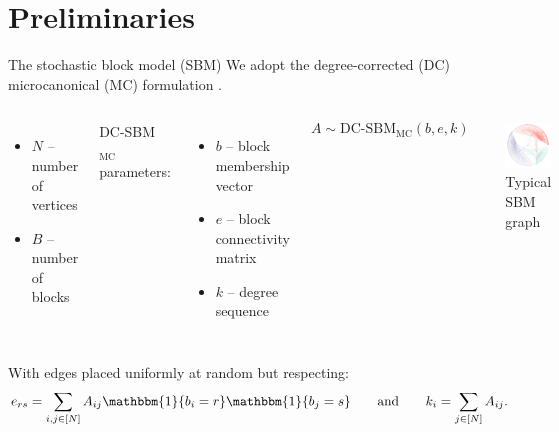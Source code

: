 \documentclass{beamer}
\newcommand{\one}{\mathbbm{1}}
\begin{document}
\section{Preliminaries}
	
	\begin{frame}{The stochastic block model (SBM)}
		We adopt the degree-corrected (DC) microcanonical (MC) formulation \cite{Peixoto-Bayesian-Microcanonical}.				
		\begin{columns}
			
			
			\begin{itemize}
				\item $N$ -- number of vertices
				\item $B$ -- number of blocks
			\end{itemize}
			\vspace{0.3cm}
			DC-SBM$_{\textrm{MC}}$ parameters:
			\begin{itemize}
				\item $b$ -- block membership vector
				\item $e$ -- block connectivity matrix
				\item $k$ -- degree sequence
			\end{itemize}
			
			$$A \sim \textrm{DC-SBM}_{\textrm{MC}}(b, e, k)$$
			
		
			\begin{figure}
				\includegraphics[width=0.6\linewidth]{polbooks-graph}
				\caption{Typical SBM graph}
			\end{figure}
		\end{columns}
		With edges placed uniformly at random but respecting:
		\begin{equation*}
			e_{rs} = \sum_{i, j \in [N]} A_{ij} 
			\one \{b_i = r\} \one \{b_j = s\} 
			\qquad 
			\textrm{and} \qquad
			k_i = \sum_{j \in [N]} A_{ij}.
			\label{eqn:sbm-constraints}
		\end{equation*}
	\end{frame}
\end{document}
